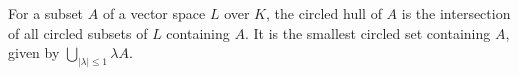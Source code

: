 For a subset $A$ of a vector space $L$ over $K$, the circled hull of $A$ is the intersection of all circled subsets of $L$ containing $A$. It is the smallest circled set containing $A$, given by $\bigcup_{|\lambda| \leq 1} \lambda A$.
